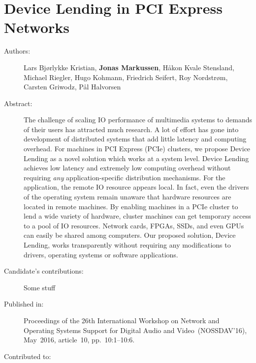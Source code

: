 \chapter{Device Lending in PCI Express Networks}
\label{paper:NOSSDAV-2016}
\paperthumb

\begin{description}
	\item[Authors:]
		Lars Bj{\o}rlykke Kristian, \textbf{Jonas Markussen}, H{\aa}kon Kvale Stensland,
		Michael Riegler, Hugo Kohmann, Friedrich Seifert, Roy Nordstr{\o}m, Carsten Griwodz, P{\aa}l Halvorsen

	\item[Abstract:]
	The challenge of scaling IO performance of multimedia systems to demands
	of their users has attracted much research.
	A lot of effort has gone into
	development of distributed systems that add little latency and computing overhead.
	For machines in PCI Express (PCIe) clusters,
	we propose Device Lending as a novel solution which works at a system
	level.
	Device Lending achieves low latency and extremely low computing overhead without
	requiring \textit{any} application-specific distribution mechanisms.
	For the application, the remote IO resource appears local.
	In fact, even the drivers of the operating system remain unaware that
	hardware resources are located in remote machines.
	By enabling machines in a PCIe cluster to lend a wide variety of hardware, 
	cluster machines can get temporary access to a pool of IO resources. 
	Network cards, FPGAs, SSDs, and even GPUs can easily be shared among computers.
	Our proposed solution, Device Lending, works transparently without requiring any modifications to drivers,
	operating systems or software applications.

	\item[Candidate's contributions:]
		Some stuff

	\item[Published in:]
		Proceedings of the 26th International Workshop on Network and Operating Systems Support for Digital Audio and Video~(NOSSDAV'16),
		May~2016, article~10, pp.~10:1--10:6.

	\item[Contributed to:]

\end{description}
